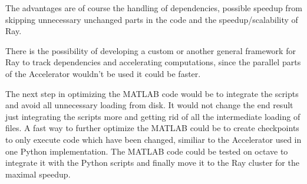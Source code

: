 \documentclass[12pt, a4paper]{article}
\begin{document}
The advantages are of course the handling of dependencies, possible speedup from skipping unnecessary unchanged parts in the code and the speedup/scalability of Ray.

There is the possibility of developing a custom or another general framework for Ray to track dependencies and accelerating computations, since the parallel parts of the Accelerator wouldn't be used it could be faster.

The next step in optimizing the MATLAB code would be to integrate the scripts and avoid all unnecessary loading from disk.
It would not change the end result just integrating the scripts more and getting rid of all the intermediate loading of files.
A fast way to further optimize the MATLAB could be to create checkpoints to only execute code which have been changed, similiar to the Accelerator used in one Python implementation.
The MATLAB code could be tested on octave to integrate it with the Python scripts and finally move it to the Ray cluster for the maximal speedup.





\newpage 
\end{document}
